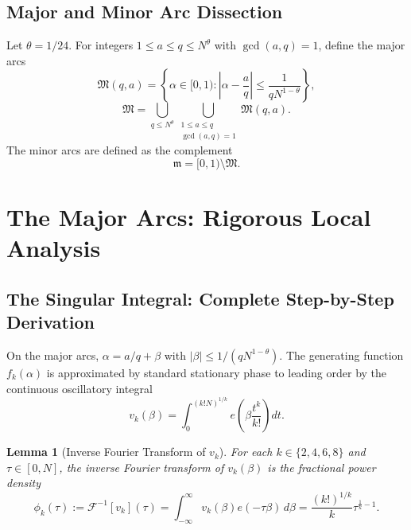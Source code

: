 \documentclass[11pt, a4paper]{article}
\theoremstyle{plain}
\newtheorem{lemma}[theorem]{Lemma}
\theoremstyle{definition}
\begin{document}
\subsection{Major and Minor Arc Dissection}
Let $\theta = 1/24$. For integers $1 \leq a \leq q \leq N^{\theta}$ with $\gcd(a,q)=1$, define the major arcs
\begin{equation}
\mathfrak{M}(q,a) = \left\{\alpha \in [0,1) : \left|\alpha - \frac{a}{q}\right| \leq \frac{1}{q N^{1-\theta}}\right\},
\end{equation}
\begin{equation}
\mathfrak{M} = \bigcup_{q \leq N^{\theta}} \bigcup_{\substack{1 \leq a \leq q \\ \gcd(a,q)=1}} \mathfrak{M}(q,a).
\end{equation}
The minor arcs are defined as the complement
\begin{equation}
\mathfrak{m} = [0,1) \setminus \mathfrak{M}.
\end{equation}

\section{The Major Arcs: Rigorous Local Analysis}
\label{sec:major}

\subsection{The Singular Integral: Complete Step-by-Step Derivation}

On the major arcs, $\alpha = a/q + \beta$ with $|\beta| \leq 1/(q N^{1-\theta})$. The generating function $f_k(\alpha)$ is approximated by standard stationary phase to leading order by the continuous oscillatory integral
\begin{equation}
v_k(\beta) = \int_0^{(k! N)^{1/k}} e\!\left(\beta \frac{t^k}{k!}\right) dt.
\end{equation}

\begin{lemma}[Inverse Fourier Transform of $v_k$]\label{lem:ft_vk}
For each $k \in \{2,4,6,8\}$ and $\tau \in [0, N]$, the inverse Fourier transform of $v_k(\beta)$ is the fractional power density
\begin{equation}
\phi_k(\tau) := \mathcal{F}^{-1}[v_k](\tau) = \int_{-\infty}^{\infty} v_k(\beta) e(-\tau\beta)\,d\beta = \frac{(k!)^{1/k}}{k} \tau^{\frac{1}{k} - 1}.
\end{equation}
\end{lemma}
\end{document}
